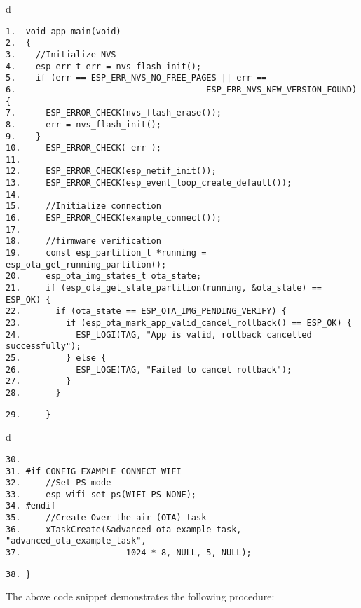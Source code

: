 \documentclass[a4paper,12pt]{book}
\begin{document}
\begin{codebloc}
\begin{tabular}{d}
\vspace{2pt}
\begin{verbatim}
1.  void app_main(void)
2.  {
3.    //Initialize NVS
4.    esp_err_t err = nvs_flash_init();
5.    if (err == ESP_ERR_NVS_NO_FREE_PAGES || err ==
6.                                      ESP_ERR_NVS_NEW_VERSION_FOUND) {
7.      ESP_ERROR_CHECK(nvs_flash_erase());
8.      err = nvs_flash_init();
9.    }
10.     ESP_ERROR_CHECK( err );
11.
12.     ESP_ERROR_CHECK(esp_netif_init());
13.     ESP_ERROR_CHECK(esp_event_loop_create_default());
14.
15.     //Initialize connection
16.     ESP_ERROR_CHECK(example_connect());
17.
18.     //firmware verification
19.     const esp_partition_t *running = esp_ota_get_running_partition();
20.     esp_ota_img_states_t ota_state;
21.     if (esp_ota_get_state_partition(running, &ota_state) == ESP_OK) {
22.       if (ota_state == ESP_OTA_IMG_PENDING_VERIFY) {
23.         if (esp_ota_mark_app_valid_cancel_rollback() == ESP_OK) {
24.           ESP_LOGI(TAG, "App is valid, rollback cancelled successfully");
25.         } else {
26.           ESP_LOGE(TAG, "Failed to cancel rollback");
27.         }
28.       }
\end{verbatim}
\verb|29.     }|
\end{tabular}
\end{codebloc}


\begin{codebloc}
\begin{tabular}{d}
\vspace{2pt}
\begin{verbatim}
30.
31. #if CONFIG_EXAMPLE_CONNECT_WIFI
32.     //Set PS mode
33.     esp_wifi_set_ps(WIFI_PS_NONE);
34. #endif 
35.     //Create Over-the-air (OTA) task
36.     xTaskCreate(&advanced_ota_example_task, "advanced_ota_example_task",
37.                     1024 * 8, NULL, 5, NULL);
\end{verbatim}
\verb|38. }|
\end{tabular}
\end{codebloc}

The above code snippet demonstrates the following procedure:
\end{document}
